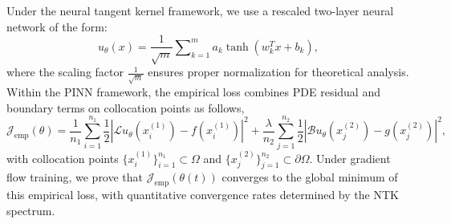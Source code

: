 \documentclass{article}
\begin{document}
Under the neural tangent kernel framework, we use a rescaled two-layer neural network of the form:
\begin{equation}
u_{\theta}(x) = \frac{1}{\sqrt{m}}\sum\nolimits_{k=1}^m a_k \tanh(w_k^T x + b_k) ,\label{eq:ntk}
\end{equation}
where the scaling factor \( \frac{1}{\sqrt{m}}\) ensures proper normalization for theoretical analysis. 
Within the PINN framework, the empirical loss combines PDE residual and boundary terms on collocation points as follows,
\begin{equation}
\mathcal{J}_{\text{emp}}(\theta) = \frac{1}{n_1} \sum_{i=1}^{n_1}\frac{1}{2} \left|\mathcal{L}u_\theta\left(x_i^{(1)}\right) - f\left(x_i^{(1)}\right)\right|^2 + \frac{\lambda}{n_2} \sum_{j=1}^{n_2}\frac{1}{2} \left|\mathcal{B}u_\theta\left(x_j^{(2)}\right) - g\left(x_j^{(2)}\right)\right|^2,  \label{eq:emp}
\end{equation} 
with collocation points \(\{x_i^{(1)}\}_{i=1}^{n_1} \subset \Omega\) and \(\{x_j^{(2)}\}_{j=1}^{n_2} \subset \partial\Omega\). 
\iffalse
Under gradient flow training, we prove that \(\mathcal{J}_{\text{emp}}(\theta(t))\) converges to the global minimum of this empirical loss, with quantitative convergence rates determined by the NTK spectrum.  
\end{document}
